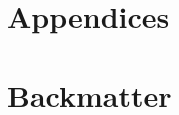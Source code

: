 \documentclass[10pt,openany]{book}
\begin{document}
\glsaddallunused
\appendix
\part{Appendices}


\backmatter


\part{Backmatter}

\end{document}
